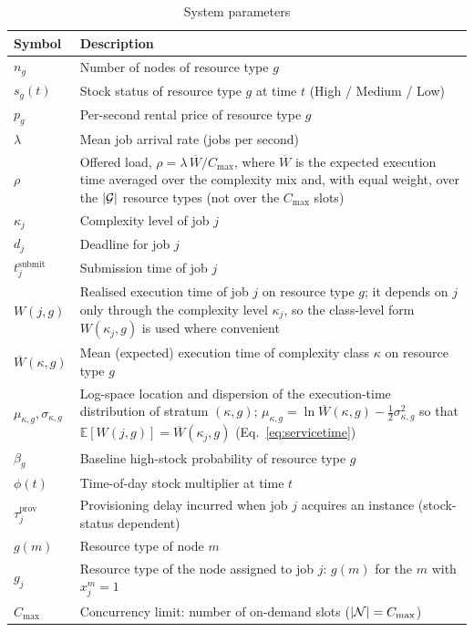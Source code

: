 \begin{table}[htbp]
\centering
\caption{System parameters}
\label{tab:parameters}
\begin{singlespace}
\small
\begin{tabular}{lp{9cm}}
\toprule
\textbf{Symbol} & \textbf{Description} \\
\midrule
$n_g$ & Number of nodes of resource type $g$ \\
$s_g(t)$ & Stock status of resource type $g$ at time $t$ (High / Medium / Low) \\
$p_g$ & Per-second rental price of resource type $g$ \\
$\lambda$ & Mean job arrival rate (jobs per second) \\
$\rho$ & Offered load, $\rho = \lambda\,\overline{W}/C_{\max}$, where $\overline{W}$ is the expected execution time averaged over the complexity mix and, with equal weight, over the $|\mathcal{G}|$ resource types (not over the $C_{\max}$ slots) \\
$\kappa_j$ & Complexity level of job $j$ \\
$d_j$ & Deadline for job $j$ \\
$t_j^{\text{submit}}$ & Submission time of job $j$ \\
$W(j,g)$ & Realised execution time of job $j$ on resource type $g$; it depends on $j$ only through the complexity level $\kappa_j$, so the class-level form $W(\kappa_j, g)$ is used where convenient \\
$\overline{W}(\kappa,g)$ & Mean (expected) execution time of complexity class $\kappa$ on resource type $g$ \\
$\mu_{\kappa,g}, \sigma_{\kappa,g}$ & Log-space location and dispersion of the execution-time distribution of stratum $(\kappa,g)$; $\mu_{\kappa,g} = \ln \overline{W}(\kappa,g) - \tfrac{1}{2}\sigma_{\kappa,g}^2$ so that $\mathbb{E}[W(j,g)] = \overline{W}(\kappa_j,g)$ (Eq.~\ref{eq:servicetime}) \\
$\beta_g$ & Baseline high-stock probability of resource type $g$ \\
$\phi(t)$ & Time-of-day stock multiplier at time $t$ \\
$\tau^{\text{prov}}_j$ & Provisioning delay incurred when job $j$ acquires an instance (stock-status dependent) \\
$g(m)$ & Resource type of node $m$ \\
$g_j$ & Resource type of the node assigned to job $j$: $g(m)$ for the $m$ with $x_j^m = 1$ \\
$C_{\max}$ & Concurrency limit: number of on-demand slots ($|\mathcal{N}| = C_{\max}$) \\

\end{tabular}
\end{singlespace}
\end{table}
